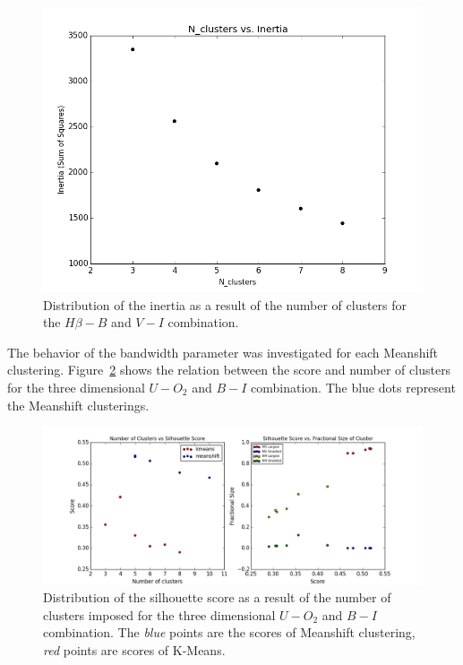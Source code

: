 \begin{figure}[H]
\centering
\includegraphics[width=\linewidth]{figs/methods/inertia_plot}
\caption{Distribution of the inertia as a result of the number of clusters for the $H\beta - B$ and $V - I$ combination.}
\label{fig:inertia}
\end{figure}

The behavior of the bandwidth parameter was investigated for each Meanshift clustering.
Figure~\ref{fig:bad_ms} shows the relation between the score and number of clusters for the three dimensional $U - O_{2}$ and $B - I$ combination.
The blue dots represent the Meanshift clusterings.

\begin{figure}[H]
\centering
\includegraphics[width=\linewidth]{figs/methods/silhouette_score_bad_ms}
\caption{Distribution of the silhouette score as a result of the number of clusters imposed for the three dimensional $U - O_{2}$ and $B - I$ combination. The \textit{blue} points are the scores of Meanshift clustering, \textit{red} points are scores of K-Means.}
\label{fig:bad_ms}
\end{figure}

